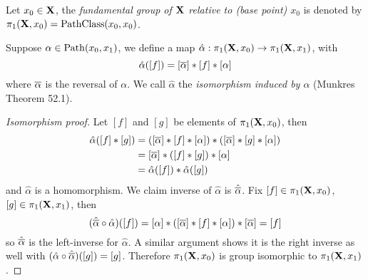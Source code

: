 \documentclass[../main-manifolds.tex]{subfiles}
\begin{document}

\begin{definition}\label{munkres:fundamental-group}
    Let $x_0\in {\mathbf{X}}$, the \emph{fundamental group of ${\mathbf{X}}$ relative to (base point) $x_0$} is denoted by $\fgroup{\xx}{x_0}=\PathClass[x_0,x_0]$.
\end{definition}
\begin{definition}\label{munkres:path-isomorphism}
    Suppose $\alpha\in\Path[x_0,x_1]$, we define a map $\hat{\alpha}:\pi_{1}({{\mathbf{X}}},{x_0})\to\pi_{1}({{\mathbf{X}}},{x_1})$, with
    \[
        \hat{\alpha}([f]) = [\overline{\alpha}]\ast[f]\ast[\alpha]
    \]
    where $\overline{\alpha}$ is the reversal of $\alpha$. We call $\hat{\alpha}$ the \emph{isomorphism induced by $\alpha$} (Munkres Theorem 52.1).
\end{definition}

\begin{proof}[Isomorphism proof]\label{munkres:theorem52.1}
    Let $[f]$ and $[g]$ be elements of $\pi_{1}({{\mathbf{X}}},{x_0})$, then 
    \begin{align*}
        \hat{\alpha}([f]\ast[g]) &= ([\overline{\alpha}]\ast[f]\ast[\alpha])\ast([\overline{\alpha}]\ast[g]\ast[\alpha])\\
        &= [\overline{\alpha}]\ast([f]\ast[g])\ast[\alpha]\\
        &= \hat{\alpha}([f])\ast\hat{\alpha}([g])
    \end{align*}
    and $\hat{\alpha}$ is a homomorphism. We claim inverse of $\hat{\alpha}$ is $\hat{\overline{\alpha}}$. Fix $[f]\in\pi_{1}({{\mathbf{X}}},{x_0})$, $[g]\in\pi_{1}({{\mathbf{X}}},{x_1})$, then
    \[
        (\hat{\overline{\alpha}}\circ\hat{\alpha})([f]) = [\alpha]\ast\qty([\overline{\alpha}]\ast[f]\ast[\alpha])\ast[\overline{\alpha}] = [f]
    \]
    so $\hat{\overline{\alpha}}$ is the left-inverse for $\hat{\alpha}$. A similar argument shows it is the right inverse as well with $(\hat{\alpha}\circ{\hat{\overline{\alpha}}})([g])=[g]$. Therefore $\pi_{1}({{\mathbf{X}}},{x_0})$ is group isomorphic to $\pi_{1}({{\mathbf{X}}},{x_1})$.
\end{proof}

\end{document}
